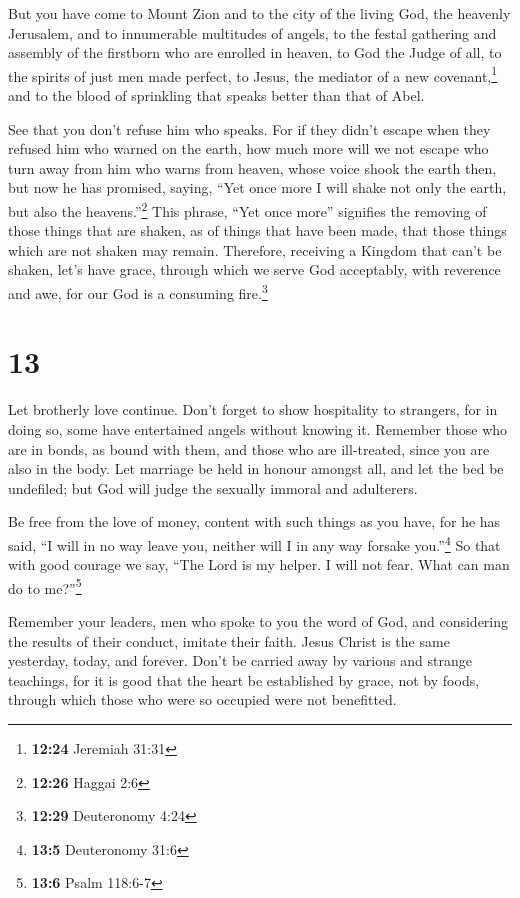  But you have come to Mount Zion and to the city of the
living God, the heavenly Jerusalem, and to innumerable multitudes of
angels,  to the festal gathering and assembly of the
firstborn who are enrolled in heaven, to God the Judge of all, to the
spirits of just men made perfect,  to Jesus, the mediator
of a new covenant,\footnote{\textbf{12:24} Jeremiah 31:31} and to the
blood of sprinkling that speaks better than that of Abel.

 See that you don't refuse him who speaks. For if they
didn't escape when they refused him who warned on the earth, how much
more will we not escape who turn away from him who warns from heaven,
 whose voice shook the earth then, but now he has
promised, saying, ``Yet once more I will shake not only the earth, but
also the heavens.''\footnote{\textbf{12:26} Haggai 2:6} 
This phrase, ``Yet once more'' signifies the removing of those things
that are shaken, as of things that have been made, that those things
which are not shaken may remain.  Therefore, receiving a
Kingdom that can't be shaken, let's have grace, through which we serve
God acceptably, with reverence and awe,  for our God is a
consuming fire.\footnote{\textbf{12:29} Deuteronomy 4:24}

\hypertarget{section-12}{%
\section{13}\label{section-12}}

 Let brotherly love continue.  Don't forget
to show hospitality to strangers, for in doing so, some have entertained
angels without knowing it.  Remember those who are in
bonds, as bound with them, and those who are ill-treated, since you are
also in the body.  Let marriage be held in honour amongst
all, and let the bed be undefiled; but God will judge the sexually
immoral and adulterers.

 Be free from the love of money, content with such things
as you have, for he has said, ``I will in no way leave you, neither will
I in any way forsake you.''\footnote{\textbf{13:5} Deuteronomy 31:6}
 So that with good courage we say, ``The Lord is my
helper. I will not fear. What can man do to me?''\footnote{\textbf{13:6}
  Psalm 118:6-7}

 Remember your leaders, men who spoke to you the word of
God, and considering the results of their conduct, imitate their faith.
 Jesus Christ is the same yesterday, today, and forever.
 Don't be carried away by various and strange teachings,
for it is good that the heart be established by grace, not by foods,
through which those who were so occupied were not benefitted.

